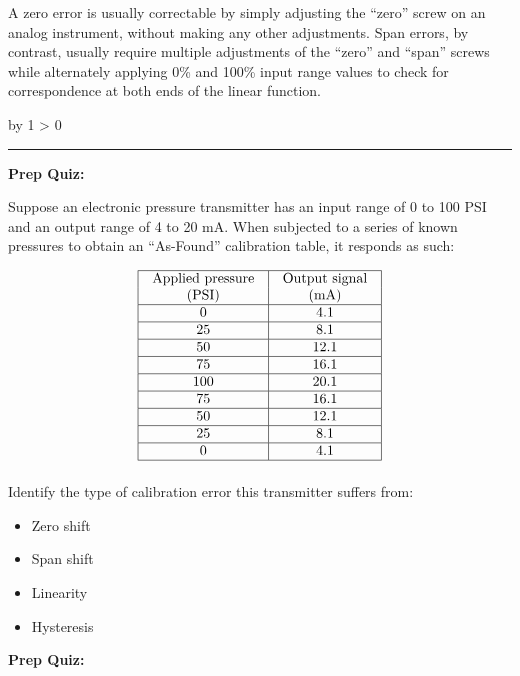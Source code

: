 \documentclass[12pt,a4paper]{article}
\def\notes{
           \advance\explnum by 1
           \ifnum \explnum > 0
                \hrule
                \vskip 3pt
                \leftline{Notes \the\explnum}
                \vskip 3pt \fi}
\begin{document}
\vskip 10pt

A zero error is usually correctable by simply adjusting the ``zero'' screw on an analog instrument, without making any other adjustments.  Span errors, by contrast, usually require multiple adjustments of the ``zero'' and ``span'' screws while alternately applying 0\% and 100\% input range values to check for correspondence at both ends of the linear function.

\vskip 10pt \filbreak 





\notes{} 

\vfil \eject

\noindent
{\bf Prep Quiz:}

Suppose an electronic pressure transmitter has an input range of 0 to 100 PSI and an output range of 4 to 20 mA.  When subjected to a series of known pressures to obtain an ``As-Found'' calibration table, it responds as such:


$$\vbox{\offinterlineskip
\halign{\strut
\vrule \quad\hfil # \ \hfil & 
\vrule \quad\hfil # \ \hfil \vrule \cr
\noalign{\hrule}
%
Applied pressure & Output signal \cr
%
(PSI) & (mA) \cr
%
\noalign{\hrule}
%
0 & 4.1 \cr
%
\noalign{\hrule}
%
25 & 8.1 \cr
%
\noalign{\hrule}
%
50 & 12.1 \cr
%
\noalign{\hrule}
%
75 & 16.1 \cr
%
\noalign{\hrule}
%
100 & 20.1 \cr
%
\noalign{\hrule}
%
75 & 16.1 \cr
%
\noalign{\hrule}
%
50 & 12.1 \cr
%
\noalign{\hrule}
%
25 & 8.1 \cr
%
\noalign{\hrule}
%
0 & 4.1 \cr
%
\noalign{\hrule}
} %
}$$ %

\vskip 10pt

Identify the type of calibration error this transmitter suffers from:

\begin{itemize}
\item{} Zero shift
\vskip 5pt 
\item{} Span shift
\vskip 5pt 
\item{} Linearity
\vskip 5pt 
\item{} Hysteresis
\end{itemize}


\vfil \eject

\noindent
{\bf Prep Quiz:}
\end{document}
